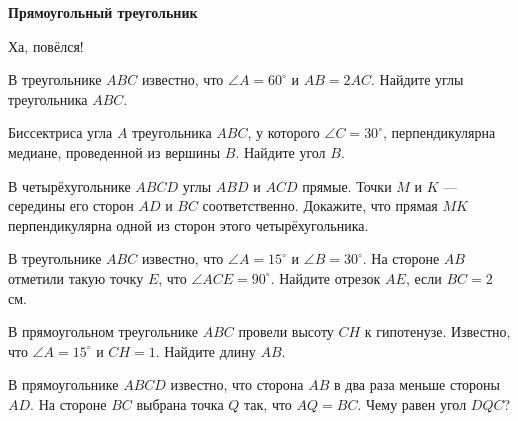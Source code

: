 \centerline{\bf \Huge Прямоугольный треугольник}

\begin{flushright}
        \scriptsize{Ха, повёлся!}
\end{flushright}

 В треугольнике $ABC$ известно, что $\angle A = 60^{\circ}$ и $AB=2AC$. Найдите углы треугольника $ABC$.


 Биссектриса угла $A$ треугольника $ABC$, у которого $\angle C = 30^{\circ}$, перпендикулярна медиане, проведенной из вершины $B$. Найдите угол $B$. 

 В четырёхугольнике $ABCD$ углы $ABD$ и $ACD$ прямые. Точки $M$ и $K$ --- середины его сторон $AD$ и $BC$ соответственно. Докажите, что прямая $MK$ перпендикулярна одной из сторон этого четырёхугольника.

 В треугольнике $A B C$ известно, что $\angle A=15^{\circ}$ и $\angle B=30^{\circ}$. На стороне $A B$ отметили такую точку $E$, что $\angle A C E=90^{\circ}$. Найдите отрезок $A E$, если $B C=2$ см.

 В прямоугольном треугольнике $ABC$ провели высоту $CH$ к гипотенузе. Известно, что $\angle A = 15^{\circ}$ и $CH = 1$. Найдите длину $AB$.

 В прямоугольнике $ABCD$ известно, что сторона $AB$ в два раза меньше стороны $AD$. На стороне $BC$ выбрана точка $Q$ так, что $AQ=BC$. Чему равен угол $DQC$? 